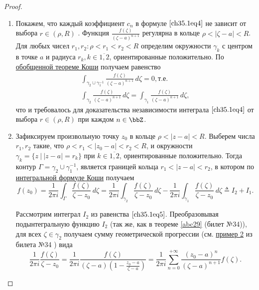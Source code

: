 \begin{proof}


\begin{enumerate}
	
\item
Покажем, что каждый коэффициент $c_n$ в формуле $\eqref{ch35.1eq4}$ не зависит от выбора $r \in (\rho, R)$ . Функция $\frac{f(\zeta)}{(\zeta - a)^{n+1}}$ регулярна в кольце $\rho < |\zeta - a| < R$. Для любых чисел $r_1, r_2: \rho < r_1 < r_2 < R$ определим окружности $\gamma_k$ с центром в точке $a$ и радиуса $r_k, k \in \overline{1,2}$, ориентированные положительно. По \hyperref[abc28]{обобщенной теореме Коши} получаем равенство
\begin{equation*}
\begin{split}
\int_{\gamma_2 \cup \gamma_{1}^{-1}} \frac{f(\zeta)}{(\zeta - a)^{n + 1}} \,d\zeta = 0, \text{т.е.}\\
\int_{\gamma_2} \frac{f(\zeta)}{(\zeta - a)^{n + 1}} \,d\zeta = \int_{\gamma_1} \frac{f(\zeta)}{(\zeta - a)^{n + 1}} \,d\zeta,
\end{split}
\end{equation*}
что и требовалось для доказательства независимости интеграла $\eqref{ch35.1eq4}$ от выбора $r \in (\rho, R)$ при каждом $n \in \bbZ$.

\item

Зафиксируем произвольную точку $z_0$ в кольце $\rho < |z - a| < R$. Выберем числа $r_1, r_2$ такие, что 
$\rho < r_1 < |z_0 - a| < r_2 < R$, и окружности $\gamma_k = \{ z \: \big| \: |z - a| = r_k\}$ при $k \in \overline{1,2}$, ориентированные положительно. Тогда контур $\Gamma = \gamma_2 \cup \gamma_{1}^{-1}$, является границей кольца $r_1 < |z - a| < r_2$, в котором по  \hyperref[ch34thm1]{интегральной формуле Коши} получаем
\begin{equation} \label{ch35.1eq5}
f(z_0) = \frac{1}{2\pi i} \int_\Gamma \frac{f(\zeta)}{\zeta - z_0} \,d\zeta = \frac{1}{2\pi i} \int_{\gamma_2} \frac{f(\zeta)}{\zeta - z_0} \,d\zeta - \frac{1}{2\pi i} \int_{\gamma_1} \frac{f(\zeta)}{\zeta - z_0} \,d\zeta \triangleq I_2 + I_1.
\end{equation}

Рассмотрим интеграл $I_2$ из равенства $\eqref{ch35.1eq5}$. Преобразовывая подынтегральную функцию $I_2$ (так же, как в теореме \ref{abc29} (билет №34)), для всех $\zeta \in \gamma_2$ получаем сумму геометрической прогрессии (см. \hyperref[exmpl2]{пример 2} из билета №34 ) вида
\begin{equation} \label{ch35.1eq6}
\frac{1}{2\pi i} \frac{f(\zeta)}{\zeta - z_0} = \frac{1}{2\pi i} \frac{f(\zeta)}{(\zeta - a) \left( 1 - \frac{z_0 - a}{\zeta - a}\right)} = \frac{1}{2\pi i}\sum\limits_{n = 0}^{+\infty} \frac{(z_0 - a)^n}{(\zeta - a)^{n + 1}} f(\zeta).
\end{equation}


\end{enumerate}
\end{proof}
